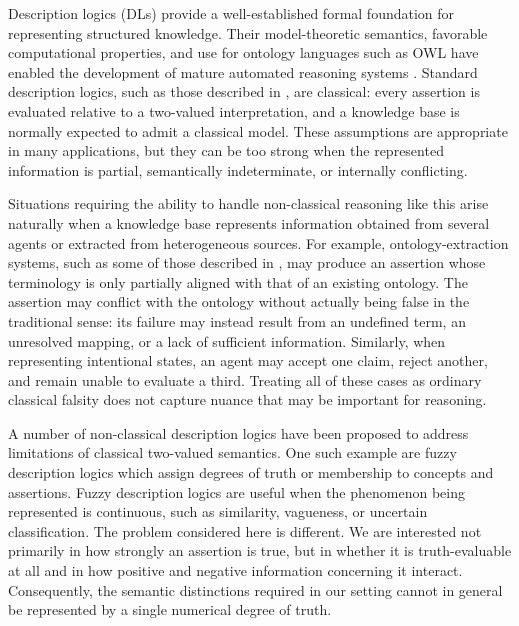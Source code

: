 \documentclass[letterpaper]{article} %
\theoremstyle{definition}
\theoremstyle{definition}
\theoremstyle{definition}
\theoremstyle{definition}
\theoremstyle{definition}
\begin{document}
Description logics (DLs) provide a well-established formal foundation for representing structured knowledge. Their model-theoretic semantics, favorable computational properties, and use for ontology languages such as OWL have enabled the development of mature automated reasoning systems \cite{DBLP:conf/ore/MatentzogluLHSP15,DBLP:series/faia/SinghBM23}. Standard description logics, such as those described in \cite{DBLP:conf/dlog/2003handbook}, are classical: every assertion is evaluated relative to a two-valued interpretation, and a knowledge base is normally expected to admit a classical model. These assumptions are appropriate in many applications, but they can be too strong when the represented information is partial, semantically indeterminate, or internally conflicting.

Situations requiring the ability to handle non-classical reasoning like this arise naturally when a knowledge base represents information obtained from several agents or extracted from heterogeneous sources. For example, ontology-extraction systems, such as some of those described in \cite{DBLP:journals/csr/ArmaryVLN25}, may produce an assertion whose terminology is only partially aligned with that of an existing ontology. The assertion may conflict with the ontology without actually being false in the traditional sense: its failure may instead result from an undefined term, an unresolved mapping, or a lack of sufficient information. Similarly, when representing intentional states, an agent may accept one claim, reject another, and remain unable to evaluate a third. Treating all of these cases as ordinary classical falsity does not capture nuance that may be important for reasoning.

A number of non-classical description logics have been proposed to address limitations of classical two-valued semantics. One such example are fuzzy description logics \cite{DBLP:conf/aaai/Straccia98,DBLP:conf/sum/BorgwardtP17} which assign degrees of truth or membership to concepts and assertions. Fuzzy description logics are useful when the phenomenon being represented is continuous, such as similarity, vagueness, or uncertain classification. The problem considered here is different. We are interested not primarily in how strongly an assertion is true, but in whether it is truth-evaluable at all and in how positive and negative information concerning it interact. Consequently, the semantic distinctions required in our setting cannot in general be represented by a single numerical degree of truth.
\end{document}
